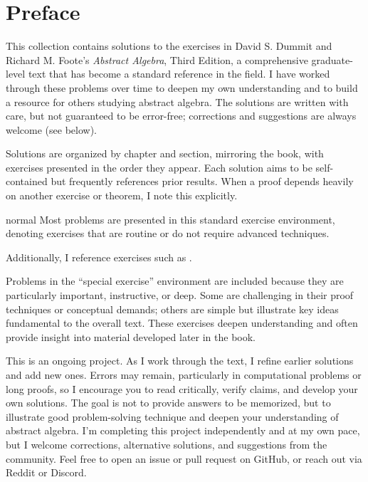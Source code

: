 \section*{Preface}

This collection contains solutions to the exercises in David S. Dummit and Richard M. Foote's \textit{Abstract Algebra}, Third Edition, a comprehensive graduate-level text that has become a standard reference in the field.
I have worked through these problems over time to deepen my own understanding and to build a resource for others studying abstract algebra.
The solutions are written with care, but not guaranteed to be error-free; corrections and suggestions are always welcome (see below).

Solutions are organized by chapter and section, mirroring the book, with exercises presented in the order they appear.
Each solution aims to be self-contained but frequently references prior results.
When a proof depends heavily on another exercise or theorem, I note this explicitly.
\begin{exercise}{normal}
    Most problems are presented in this standard exercise environment, denoting exercises that are routine or do not require advanced techniques.

	


	Additionally, I reference exercises such as .
\end{exercise}
\begin{spex}
    Problems in the ``special exercise'' environment are included because they are particularly important, instructive, or deep.
	Some are challenging in their proof techniques or conceptual demands; others are simple but illustrate key ideas fundamental to the overall text.
	These exercises deepen understanding and often provide insight into material developed later in the book.
\end{spex}
This is an ongoing project.
As I work through the text, I refine earlier solutions and add new ones.
Errors may remain, particularly in computational problems or long proofs, so I encourage you to read critically, verify claims, and develop your own solutions.
The goal is not to provide answers to be memorized, but to illustrate good problem-solving technique and deepen your understanding of abstract algebra.
I'm completing this project independently and at my own pace, but I welcome corrections, alternative solutions, and suggestions from the community.
Feel free to open an issue or pull request on GitHub, or reach out via Reddit or Discord.

